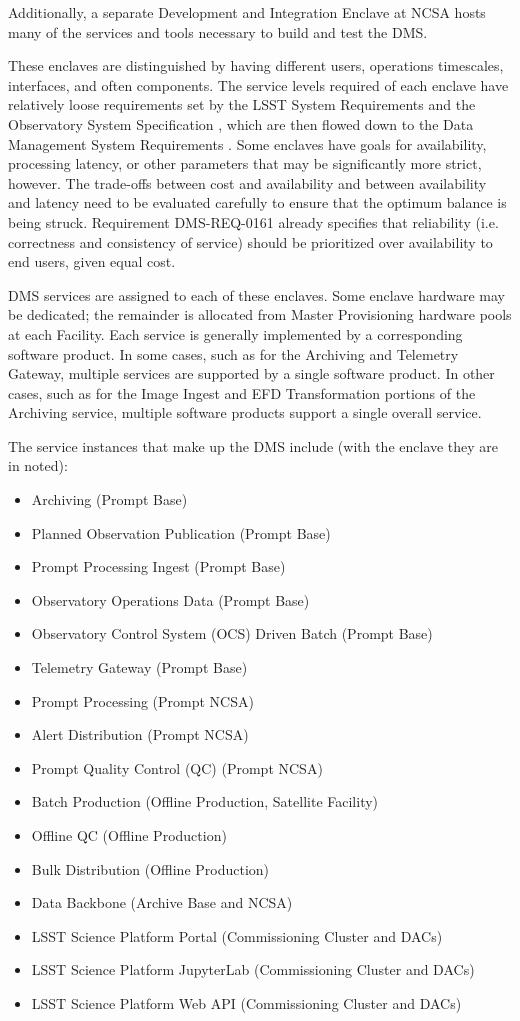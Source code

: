 \documentclass[DM,toc]{lsstdoc}
\begin{document}
Additionally, a separate Development and Integration Enclave at NCSA hosts many of the services and tools necessary to build and test the DMS.

These enclaves are distinguished by having different users, operations timescales, interfaces, and often components.
The service levels required of each enclave have relatively loose requirements set by the LSST System Requirements  and the Observatory System Specification , which are then flowed down to the Data Management System Requirements .
Some enclaves have goals for availability, processing latency, or other parameters that may be significantly more strict, however.
The trade-offs between cost and availability and between availability and latency need to be evaluated carefully to ensure that the optimum balance is being struck.
Requirement DMS-REQ-0161 already specifies that reliability (i.e. correctness and consistency of service) should be prioritized over availability to end users, given equal cost.

DMS services are assigned to each of these enclaves.  Some enclave hardware may be dedicated; the remainder is allocated from Master Provisioning hardware pools at each Facility.
Each service is generally implemented by a corresponding software product.
In some cases, such as for the Archiving and Telemetry Gateway, multiple services are supported by a single software product.
In other cases, such as for the Image Ingest and EFD Transformation portions of the Archiving service, multiple software products support a single overall service.

The service instances that make up the DMS include (with the
enclave they are in noted):
\begin{itemize}
\item
  Archiving (Prompt Base)
\item
  Planned Observation Publication (Prompt Base)
\item
  Prompt Processing Ingest (Prompt Base)
\item
  Observatory Operations Data (Prompt Base)
\item
  Observatory Control System (OCS) Driven Batch (Prompt Base)
\item
  Telemetry Gateway (Prompt Base)
\item
  Prompt Processing (Prompt NCSA)
\item
  Alert Distribution (Prompt NCSA)
\item
  Prompt Quality Control (QC) (Prompt NCSA)
\item
  Batch Production (Offline Production, Satellite Facility)
\item
  Offline QC (Offline Production)
\item
  Bulk Distribution (Offline Production)
\item
  Data Backbone (Archive Base and NCSA)
\item
  LSST Science Platform Portal (Commissioning Cluster and DACs)
\item
  LSST Science Platform JupyterLab (Commissioning Cluster and DACs)
\item
  LSST Science Platform Web API (Commissioning Cluster and DACs)
\end{itemize}
\end{document}
